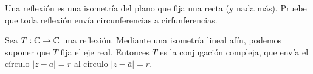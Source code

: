 \begin{exercise}
Una reflexión es una isometría del plano que fija una recta (y nada más). Pruebe que toda reflexión envía circunferencias a cirfunferencias.
\end{exercise}

\begin{solution}
Sea $T : \mathbb C \to \mathbb C$ una reflexión. Mediante una isometría lineal afín, podemos suponer que $T$ fija el eje real. Entonces $T$ es la conjugación compleja, que envía el círculo $|z - a| = r$ al círculo $|z - \bar a| = r$.
\end{solution}
